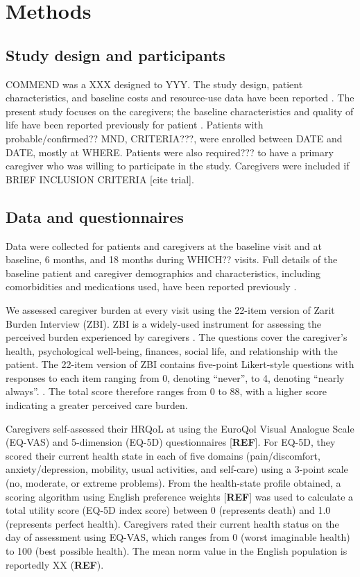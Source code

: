 \documentclass[12pt]{article}
\begin{document}
\section{Methods}

\subsection{Study design and participants}
COMMEND was a XXX designed to YYY. The study design, patient
characteristics, and baseline costs and resource-use data
have been reported \parencite{gould_randomised_2022}. The present study focuses on the caregivers; the baseline characteristics and quality of life have been reported previously for patient  \parencite{gould_acceptance_2024}. Patients with
probable/confirmed?? MND, CRITERIA???, were enrolled between
DATE and DATE, mostly at WHERE. Patients were
also required??? to have a primary caregiver who was
willing to participate in the study. Caregivers were included if BRIEF INCLUSION CRITERIA [cite trial]. 

\subsection{Data and questionnaires}
Data were collected for patients and caregivers at the
baseline visit and at baseline, 6 months, and 18 months during WHICH?? visits. Full details of the baseline patient and caregiver
demographics and characteristics, including comorbidities
and medications used, have been reported previously \parencite{gould_acceptance_2024, keetharuth_costeffectiveness_2024}.

We assessed caregiver burden at every visit using the 22-item version of Zarit Burden Interview (ZBI). ZBI is a widely-used instrument for assessing the perceived burden experienced by caregivers \parencite{zarit_relatives_1980}. The questions cover the caregiver’s health, psychological well-being, finances, social life, and relationship with the patient. The 22-item version of ZBI contains five-point Likert-style questions with responses to each item ranging from 0, denoting “never”, to 4, denoting “nearly always”. \parencite{zarit_hidden_1985}. The total score therefore ranges from 0 to 88, with a higher score indicating a greater perceived care burden. 

Caregivers self-assessed their HRQoL at using the EuroQol Visual Analogue Scale (EQ-VAS) and 5-dimension (EQ-5D) questionnaires [\textbf{REF}]. For EQ-5D, they scored their current health state in each of five domains (pain/discomfort, anxiety/depression, mobility, usual activities, and self-care) using a 3-point scale (no, moderate, or extreme problems). From the health-state profile obtained, a scoring algorithm using English preference weights [\textbf{REF}] was used to calculate a total utility score (EQ-5D index score) between 0 (represents death) and 1.0 (represents perfect health). Caregivers rated their current health status on the day of assessment using EQ-VAS, which ranges from 0 (worst imaginable health) to 100 (best possible health). The mean norm value in the English population is reportedly XX (\textbf{REF}). 
\end{document}
